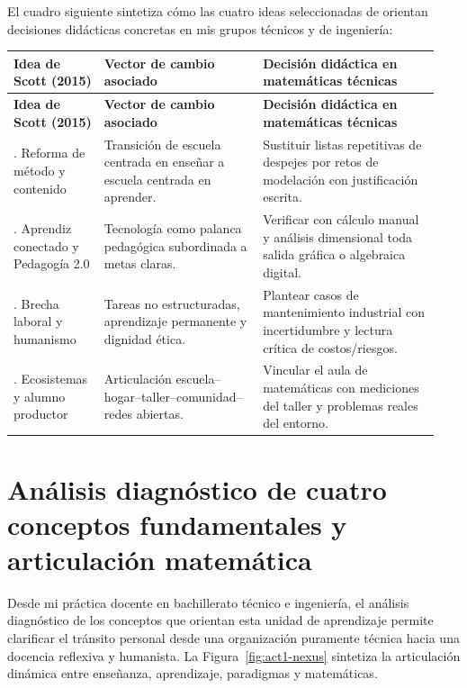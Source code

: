 \documentclass[spanish,letterpaper,oneside]{article}
\begin{document}
El cuadro siguiente sintetiza cómo las cuatro ideas seleccionadas de \citet{scott2015futuro} orientan decisiones didácticas concretas en mis grupos técnicos y de ingeniería:

{\small{}\renewcommand{\arraystretch}{1.32}
\begin{longtable}{|>{\raggedright\arraybackslash}p{0.20\linewidth}|>{\raggedright\arraybackslash}p{0.35\linewidth}|>{\raggedright\arraybackslash}p{0.39\linewidth}|}\hline
\rowcolor{iiiepePale} \textbf{Idea de Scott (2015)} & \textbf{Vector de cambio asociado} & \textbf{Decisión didáctica en matemáticas técnicas} \\\hline
\endfirsthead
\hline
\rowcolor{iiiepePale} \textbf{Idea de Scott (2015)} & \textbf{Vector de cambio asociado} & \textbf{Decisión didáctica en matemáticas técnicas} \\\hline
\endhead
1. Reforma de método y contenido & Transición de escuela centrada en enseñar a escuela centrada en aprender. & Sustituir listas repetitivas de despejes por retos de modelación con justificación escrita. \\\hline
2. Aprendiz conectado y Pedagogía 2.0 & Tecnología como palanca pedagógica subordinada a metas claras. & Verificar con cálculo manual y análisis dimensional toda salida gráfica o algebraica digital. \\\hline
3. Brecha laboral y humanismo & Tareas no estructuradas, aprendizaje permanente y dignidad ética. & Plantear casos de mantenimiento industrial con incertidumbre y lectura crítica de costos/riesgos. \\\hline
4. Ecosistemas y alumno productor & Articulación escuela--hogar--taller--comunidad--redes abiertas. & Vincular el aula de matemáticas con mediciones del taller y problemas reales del entorno. \\\hline
\end{longtable}}

\section{Análisis diagnóstico de cuatro conceptos fundamentales y articulación matemática}
Desde mi práctica docente en bachillerato técnico e ingeniería, el análisis diagnóstico de los conceptos que orientan esta unidad de aprendizaje permite clarificar el tránsito personal desde una organización puramente técnica hacia una docencia reflexiva y humanista. La Figura~\ref{fig:act1-nexus} sintetiza la articulación dinámica entre enseñanza, aprendizaje, paradigmas y matemáticas.
\end{document}
